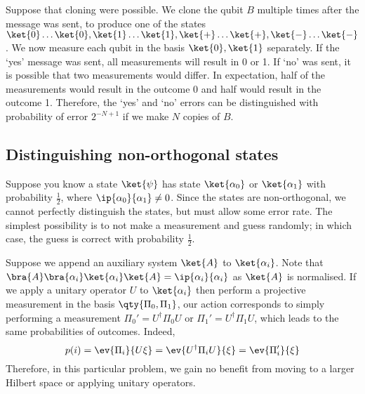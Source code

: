 Suppose that cloning were possible.
We clone the qubit $B$ multiple times after the message was sent, to produce one of the states $\ket{0} \dots \ket{0}, \ket{1} \dots \ket{1}, \ket{+} \dots \ket{+}, \ket{-} \dots \ket{-}$.
We now measure each qubit in the basis $\ket{0}, \ket{1}$ separately.
If the `yes' message was sent, all measurements will result in 0 or 1.
If `no' was sent, it is possible that two measurements would differ.
In expectation, half of the measurements would result in the outcome 0 and half would result in the outcome 1.
Therefore, the `yes' and `no' errors can be distinguished with probability of error $2^{-N+1}$ if we make $N$ copies of $B$.

\subsection{Distinguishing non-orthogonal states}
Suppose you know a state $\ket{\psi}$ has state $\ket{\alpha_0}$ or $\ket{\alpha_1}$ with probability $\frac{1}{2}$, where $\ip{\alpha_0}{\alpha_1} \neq 0$.
Since the states are non-orthogonal, we cannot perfectly distinguish the states, but must allow some error rate.
The simplest possibility is to not make a measurement and guess randomly; in which case, the guess is correct with probability $\frac{1}{2}$.

Suppose we append an auxiliary system $\ket{A}$ to $\ket{\alpha_i}$.
Note that $\bra{A}\bra{\alpha_i}\ket{\alpha_i}\ket{A} = \ip{\alpha_i}{\alpha_i}$ as $\ket{A}$ is normalised.
If we apply a unitary operator $U$ to $\ket{\alpha_i}$ then perform a projective measurement in the basis $\qty{\Pi_0, \Pi_1}$, our action corresponds to simply performing a measurement $\Pi_0' = U^\dagger \Pi_0 U$ or $\Pi_1' = U^\dagger \Pi_1 U$, which leads to the same probabilities of outcomes.
Indeed,
\[ p(i) = \ev{\Pi_i}{U\xi} = \ev{U^\dagger \Pi_i U}{\xi} = \ev{\Pi_i'}{\xi} \]
Therefore, in this particular problem, we gain no benefit from moving to a larger Hilbert space or applying unitary operators.

